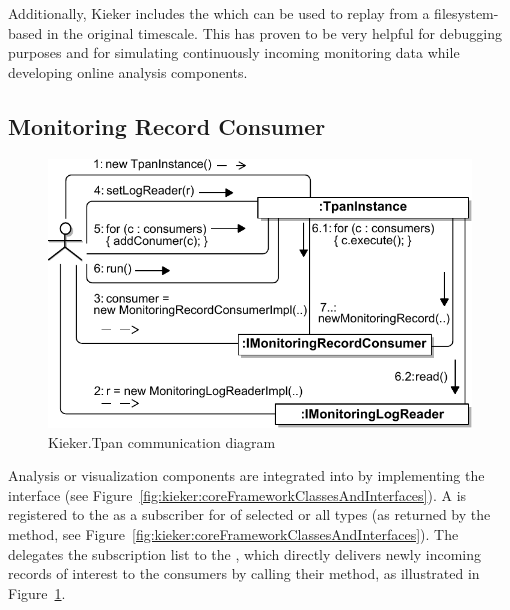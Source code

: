 Additionally, Kieker includes the \MonitoringLogReader{}  %
which can be used to replay \MonitoringRecords{} from a filesystem-based %
\MonitoringLog{} in the original timescale. This has proven to be very helpful for debugging purposes and for simulating %
continuously incoming monitoring data while developing online analysis components. %
% 
\subsection{Monitoring Record Consumer}
% 
\begin{figure}\centering
\includegraphics[width=\columnwidth]{figures/LogAnalysisCommunications-bw}%
\caption{Kieker.Tpan communication diagram}
\label{fig:tpanCommunicationDiagram}
\end{figure}
% 
\noindent Analysis or visualization components are integrated into \KiekerTpan{} %
by implementing the  interface (see Figure~\ref{fig:kieker:coreFrameworkClassesAndInterfaces}). %
A \MonitoringRecordConsumer{} is registered to the \TpanInstance{} as a subscriber
for \MonitoringRecords{} of selected or all \MonitoringRecord{} types %
(as returned by the  method, see Figure~\ref{fig:kieker:coreFrameworkClassesAndInterfaces}). %
The \TpanInstance{} delegates the subscription list to the \MonitoringLogReader{},
which directly delivers newly incoming records of interest to the consumers by calling their
 method, as illustrated in %
Figure~\ref{fig:tpanCommunicationDiagram}. %

